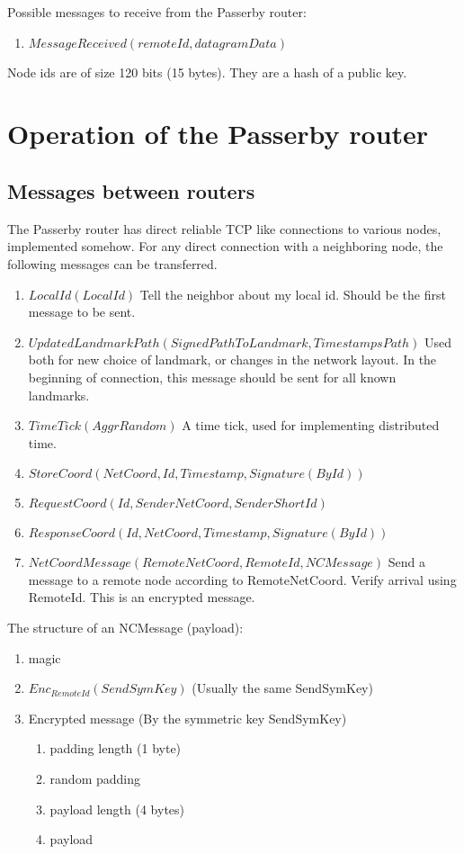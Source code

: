 \documentclass{amsart}
\theoremstyle{definition}
\theoremstyle{remark}
\numberwithin{equation}{section}
\begin{document}
Possible messages to receive from the Passerby router:
\begin{enumerate}
  \item $MessageReceived (remoteId, datagramData)$
\end{enumerate}

Node ids are of size 120 bits (15 bytes). They are a hash of a public key.

\section{Operation of the Passerby router}

\subsection{Messages between routers}

The Passerby router has direct reliable TCP like connections to various nodes,
implemented somehow. For any direct connection with a neighboring node, the
following messages can be transferred.



\begin{enumerate}
  \item $LocalId(LocalId)$
      Tell the neighbor about my local id. Should be the first message to be
      sent.
  \item $UpdatedLandmarkPath(SignedPathToLandmark, TimestampsPath)$
      Used both for new choice of landmark, or changes in the network layout.
      In the beginning of connection, this message should be sent for all known
      landmarks. 
  \item $TimeTick(AggrRandom)$
      A time tick, used for implementing distributed time.

  \item $StoreCoord(NetCoord, Id, Timestamp, Signature(By Id))$
  \item $RequestCoord(Id, SenderNetCoord, SenderShortId)$
  \item $ResponseCoord(Id, NetCoord, Timestamp, Signature(By Id))$ 

  \item $NetCoordMessage(RemoteNetCoord, RemoteId, NCMessage)$
    Send a message to a remote node according to RemoteNetCoord. Verify arrival
    using RemoteId. This is an encrypted message.
\end{enumerate}

The structure of an NCMessage (payload):
\begin{enumerate}
  \item magic
  \item $Enc_{RemoteId}(SendSymKey)$ (Usually the same SendSymKey)
  \item Encrypted message (By the symmetric key SendSymKey)
    \begin{enumerate}
      \item padding length (1 byte)
      \item random padding
      \item payload length (4 bytes)
      \item payload
    \end{enumerate}
\end{enumerate}
\end{document}
